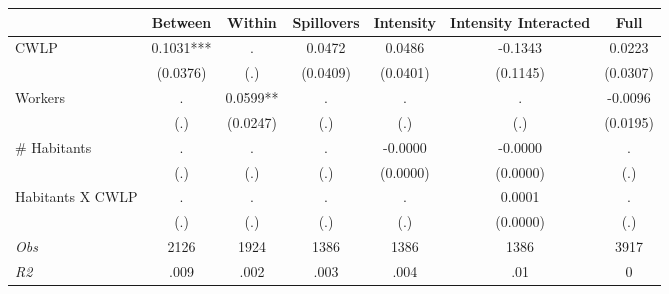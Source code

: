 \begin{tabular}{l*{6}{c}}\hline&\multicolumn{1}{c}{Between}&\multicolumn{1}{c}{Within}&\multicolumn{1}{c}{Spillovers}&\multicolumn{1}{c}{Intensity}&\multicolumn{1}{c}{Intensity Interacted}&\multicolumn{1}{c}{Full}\\ \hline 
CWLP & 0.1031*** & . & 0.0472 & 0.0486 & -0.1343 & 0.0223 \\
 & (0.0376) & (.) & (0.0409) & (0.0401) & (0.1145) & (0.0307) \\
Workers & . & 0.0599** & . & . & . & -0.0096 \\
 & (.) & (0.0247) & (.) & (.) & (.) & (0.0195) \\
\# Habitants & . & . & . & -0.0000 & -0.0000 & . \\
 & (.) & (.) & (.) & (0.0000) & (0.0000) & (.) \\
Habitants X CWLP & . & . & . & . & 0.0001 & . \\
 & (.) & (.) & (.) & (.) & (0.0000) & (.) \\
\hline \textit{Obs} & 2126 & 1924 & 1386 & 1386 & 1386 & 3917 \\ \textit{R2} & .009 & .002 & .003 & .004 & .01 & 0 \\ \hline \end{tabular}
